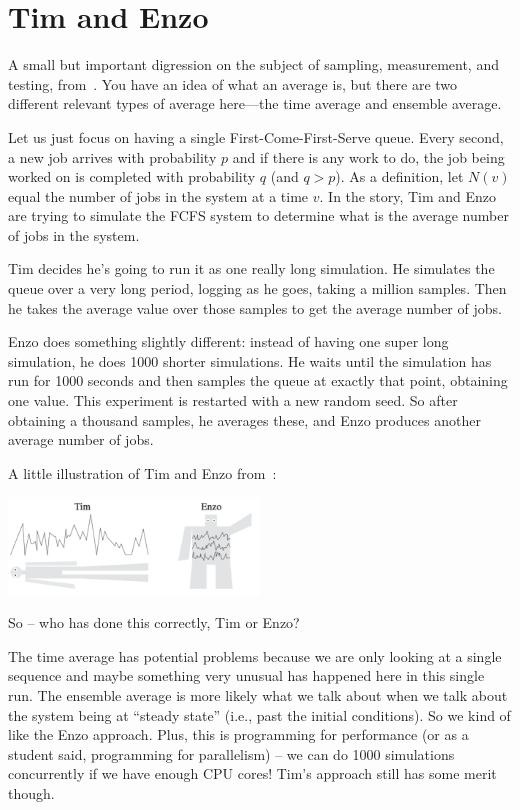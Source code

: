 \documentclass[a4paper]{report}
\begin{document}
\section*{Tim and Enzo}
A small but important digression on the subject of sampling, measurement, and testing, from~\cite{pmd}. You have an idea of what an average is, but there are two different relevant types of average here---the time average and ensemble average. 

Let us just focus on having a single First-Come-First-Serve queue. Every second, a new job arrives with probability $p$ and if there is any work to do, the job being worked on is completed with probability $q$ (and $q > p$). As a definition, let $N(v)$ equal the number of jobs in the system at a time $v$. In the story, Tim and Enzo are trying to simulate the FCFS system to determine what is the average number of jobs in the system. 

Tim decides he's going to run it as one really long simulation. He simulates the queue over a very long period, logging as he goes, taking a million samples. Then he takes the average value over those samples to get the average number of jobs.

Enzo does something slightly different: instead of having one super long simulation, he does 1000 shorter simulations. He waits until the simulation has run for 1000 seconds and then samples the queue at exactly that point, obtaining one value. This experiment is restarted with a new random seed. So after obtaining a thousand samples, he averages these, and Enzo produces another average number of jobs.

A little illustration of Tim and Enzo from~\cite{pmd}:

\begin{center}
	\includegraphics[width=0.5\textwidth]{images/timenzo.png}
\end{center}

So -- who has done this correctly, Tim or Enzo?

The time average has potential problems because we are only looking at a single sequence and maybe something very unusual has happened here in this single run. The ensemble average is more likely what we talk about when we talk about the system being at ``steady state'' (i.e., past the initial conditions). So we kind of like the Enzo approach. Plus, this is programming for performance (or as a student said, programming for parallelism) -- we can do 1000 simulations concurrently if we have enough CPU cores! Tim's approach still has some merit though.
\end{document}
